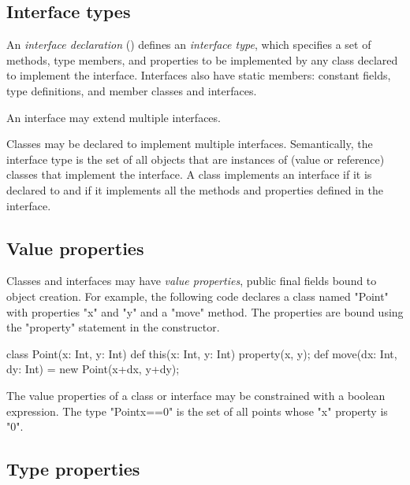 \subsection{Interface types}
\label{InterfaceTypes}


        An {\em interface declaration} ()
        defines an {\em interface type}, which specifies a set of
        methods, type members, and properties to be implemented by any class
        declared to implement the interface.  Interfaces also
        have static members: constant fields, type definitions,
        and member classes and interfaces.

        An interface may extend multiple interfaces.

Classes may be declared to implement 
multiple interfaces. 
Semantically, the interface type is the set of all objects that are
instances of (value or reference) classes that implement the
interface. A class implements an interface if it is declared to
and if
it implements all the methods and properties defined in the interface.

\subsection{Value properties}


        Classes and interfaces may have {\em value properties},
        public final fields bound to object creation.  
%
        For example, the following code declares a class named
        \xcd"Point" with properties \xcd"x" and \xcd"y"
        and a \xcd"move" method.  The properties are bound
        using the \xcd"property" statement in the constructor.

\begin{xten}
class Point(x: Int, y: Int) {
  def this(x: Int, y: Int) { property(x, y); }
  def move(dx: Int, dy: Int) = new Point(x+dx, y+dy);
}
\end{xten}

        The value properties of a class or interface may be
        constrained with a boolean expression.  The type
        \xcd"Point{x==0}" is the set of all points whose \xcd"x"
        property is \xcd"0".


\subsection{Type properties}
\label{TypeProperties}

